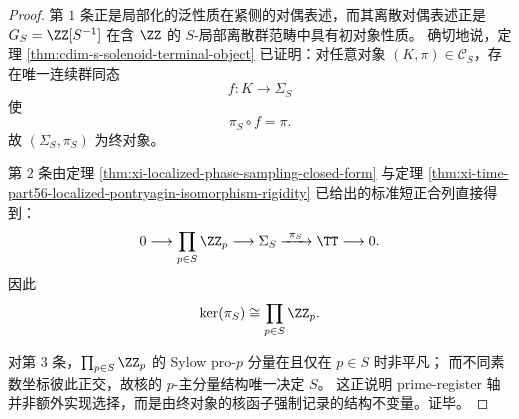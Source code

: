 \begin{proof}
第 \(1\) 条正是局部化的泛性质在紧侧的对偶表述，而其离散对偶表述正是 \(G_S=\ZZ[S^{-1}]\) 在含 \(\ZZ\) 的 \(S\)-局部离散群范畴中具有初对象性质。
确切地说，定理 \ref{thm:cdim-s-solenoid-terminal-object} 已证明：对任意对象 \((K,\pi)\in\mathcal C_S\)，存在唯一连续群同态
\[
f:K\longrightarrow \Sigma_S
\]
使
\[
\pi_S\circ f=\pi.
\]
故 \((\Sigma_S,\pi_S)\) 为终对象。

第 \(2\) 条由定理 \ref{thm:xi-localized-phase-sampling-closed-form} 与定理 \ref{thm:xi-time-part56-localized-pontryagin-isomorphism-rigidity} 已给出的标准短正合列直接得到：
\[
0\longrightarrow \prod_{p\in S}\ZZ_p
\longrightarrow \Sigma_S
\xrightarrow{\ \pi_S\ }
\TT
\longrightarrow 0.
\]
因此
\[
\ker(\pi_S)\cong \prod_{p\in S}\ZZ_p.
\]

对第 \(3\) 条，\(\prod_{p\in S}\ZZ_p\) 的 Sylow pro-\(p\) 分量在且仅在 \(p\in S\) 时非平凡；
而不同素数坐标彼此正交，故核的 \(p\)-主分量结构唯一决定 \(S\)。
这正说明 prime-register 轴并非额外实现选择，而是由终对象的核函子强制记录的结构不变量。证毕。
\end{proof}
